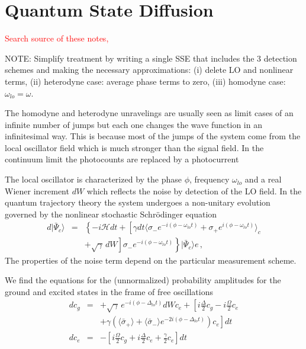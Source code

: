 \documentclass[twocolumn,aps,eqsecnum,showkeys,amsmath]{revtex4}
\newcommand{\mcH}{\mathcal{H}} 	%
\providecommand{\vxp}[1]{\langle #1 \rangle}
\providecommand{\ket}[1]{\lvert #1 \rangle}
\begin{document}
\section{Quantum State Diffusion}
\textcolor{red}{Search source of these notes, \cite{WiMi93b}}

NOTE: Simplify treatment by writing a single SSE that includes the 3 detection 
schemes and making the necessary approximations: (i) delete LO and nonlinear 
terms, (ii) heterodyne case: average phase terms to zero, (iii) homodyne case: 
$\omega_{lo} = \omega$.

The homodyne and heterodyne unravelings are usually seen as limit cases of 
an infinite number of jumps but each one changes the wave function in an 
infinitesimal way. This is because most of the jumps of the system come from 
the local oscillator field which is much stronger than the signal field. In the 
continuum limit the photocounts are replaced by a photocurrent

The local oscillator is characterized by the phase $\phi$, frequency 
$\omega_{lo}$ and a real Wiener increment $dW$ which reflects the noise by 
detection of the LO field. In the quantum trajectory theory \cite{Carm93} the 
system undergoes a non-unitary evolution governed by the nonlinear stochastic Schr\"{o}dinger equation 
%
\begin{eqnarray} 	\label{GeneralSSE} 
d \ket{\bar{\Psi}_c } &=& \left\{ -i\mcH dt +\left[ 
	\gamma dt  \vxp{ \sigma_- e^{-i(\phi -\omega_{lo}t)} 
  	+\sigma_+ e^{i(\phi -\omega_{lo}t)} }_c \right. \right. 
		\nonumber 	\\
&& \left. \left. +\sqrt{\gamma} \, dW \right] 
	\sigma_- e^{-i(\phi-\omega_{lo}t)} 	\right\}   \ket{\bar{\Psi}_c}e 	\,,	
\end{eqnarray}
The properties of the noise term depend on the particular measurement 
scheme. 

We find the equations for the (unnormalized) probability amplitudes 
for the ground and excited states in the frame of free oscillations 
%
\begin{subequations}
\label{eq:GeneralSSEamp}
\begin{eqnarray}
dc_g &=& +\sqrt{\gamma} \, e^{-i(\phi-\Delta_{lo}t)} dW c_e 
	+\left[ i\frac{\Delta}{2} c_g -i\frac{\Omega}{2} c_e 	\right. 	
	\nonumber 	\\
&& \left. +\gamma \left( \vxp{\bar{\sigma}_+} 
	+\vxp{\bar{\sigma}_-} e^{-2i(\phi-\Delta_{lo}t)} \right) c_e \right] dt 	\\
%
dc_e &=& -\left[ i\frac{\Omega}{2} c_g 
 	+i\frac{\Delta}{2} c_e +\frac{\gamma}{2} c_e \right] dt
\end{eqnarray}
\end{subequations}
\end{document}

